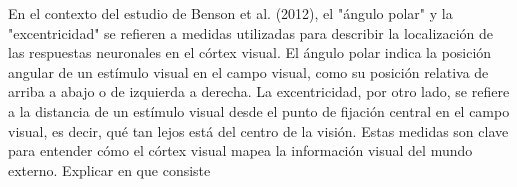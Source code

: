 

En el contexto del estudio de Benson et al. (2012), el "ángulo polar" y la "excentricidad" se refieren a medidas utilizadas para describir la localización de las respuestas neuronales en el córtex visual. El ángulo polar indica la posición angular de un estímulo visual en el campo visual, como su posición relativa de arriba a abajo o de izquierda a derecha. La excentricidad, por otro lado, se refiere a la distancia de un estímulo visual desde el punto de fijación central en el campo visual, es decir, qué tan lejos está del centro de la visión. Estas medidas son clave para entender cómo el córtex visual mapea la información visual del mundo externo.
Explicar en que consiste

